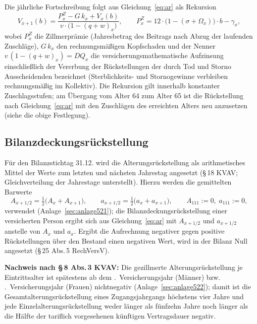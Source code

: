 Die jährliche Fortschreibung folgt aus Gleichung~\eqref{eq:ar} als
Rekursion
\begin{equation}
V_{x+1}(b) = \frac{P^{Z}_x - G\,k_x + V_x(b)}{v\cdot\bigl(1-(q+w)_x\bigr)},
\qquad P^{Z}_x = 12\cdot\bigl(1-(\sigma+\Omega_x)\bigr)\cdot b - \gamma_x,
\label{eq:arrek}
\end{equation}
wobei $P^{Z}_x$ die Zillmerprämie (Jahresbetrag des Beitrags nach Abzug
der laufenden Zuschläge), $G\,k_x$ den rechnungsmäßigen Kopfschaden und
der Nenner $v\,(1-(q+w)_x) = DQ_x$ die versicherungsmathematische
Aufzinsung einschließlich der Vererbung der Rückstellungen der durch
Tod und Storno Ausscheidenden bezeichnet (Sterblichkeits- und
Stornogewinne verbleiben rechnungsmäßig im Kollektiv). Die Rekursion
gilt innerhalb konstanter Zuschlagsstufen; am Übergang vom Alter 64
zum Alter 65 ist die Rückstellung nach Gleichung~\eqref{eq:ar} mit den
Zuschlägen des erreichten Alters neu anzusetzen (siehe die obige
Festlegung).

\subsection{Bilanzdeckungsrückstellung}\label{sec:bilanzar}

Für den Bilanzstichtag 31.12. wird die Alterungsrückstellung als
arithmetisches Mittel der Werte zum letzten und nächsten Jahrestag
angesetzt (\S\,18 KVAV; Gleichverteilung der Jahrestage unterstellt).
Hierzu werden die gemittelten Barwerte
\begin{equation}
A_{x+1/2} = \tfrac{1}{2}\bigl(A_x + A_{x+1}\bigr),
\qquad
a_{x+1/2} = \tfrac{1}{2}\bigl(a_x + a_{x+1}\bigr),
\qquad A_{111} := 0,\; a_{111} := 0,
\label{eq:halbbarwerte}
\end{equation}
verwendet (Anlage~\ref{sec:anlage521}); die
Bilanzdeckungsrückstellung einer versicherten Person ergibt sich aus
Gleichung~\eqref{eq:ar} mit $A_{x+1/2}$ und $a_{x+1/2}$ anstelle von
$A_x$ und $a_x$. Ergibt die Aufrechnung negativer gegen positive
Rückstellungen über den Bestand einen negativen Wert, wird in der
Bilanz Null angesetzt (\S\,25 Abs.\,5 RechVersV).

\textbf{Nachweis nach \S\,8 Abs.\,3 KVAV:} Die gezillmerte
Alterungsrückstellung je Eintrittsalter ist spätestens ab dem
\MaxNegM.~Versicherungsjahr (Männer) bzw. \MaxNegF.~Versicherungsjahr
(Frauen) nichtnegativ (Anlage~\ref{sec:anlage522});
damit ist die Gesamtalterungsrückstellung eines Zugangsjahrgangs
höchstens vier Jahre und jede Einzelalterungsrückstellung weder länger
als fünfzehn Jahre noch länger als die Hälfte der tariflich
vorgesehenen künftigen Vertragsdauer negativ.

